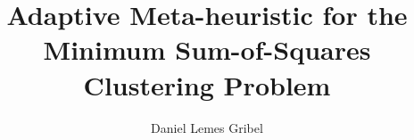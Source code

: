 \documentclass[
  msc
]{ThesisPUC}
\author{Daniel Lemes Gribel}
\title{Adaptive Meta-heuristic for the Minimum Sum-of-Squares Clustering Problem}
\begin{document}
  
  
  
  
  
  \arial
  
  \normalfont
\end{document}
